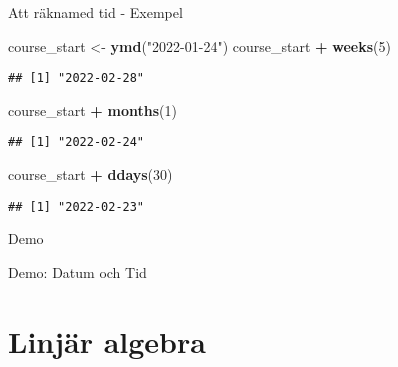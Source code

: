 \documentclass[
  11pt,
  ignorenonframetext,
  handout]{beamer}
\newenvironment{Shaded}{\begin{snugshade}}{\end{snugshade}}
\newcommand{\DecValTok}[1]{\textcolor[rgb]{0.00,0.00,0.81}{#1}}
\newcommand{\FunctionTok}[1]{\textcolor[rgb]{0.13,0.29,0.53}{\textbf{#1}}}
\newcommand{\NormalTok}[1]{#1}
\newcommand{\OtherTok}[1]{\textcolor[rgb]{0.56,0.35,0.01}{#1}}
\newcommand{\SpecialCharTok}[1]{\textcolor[rgb]{0.81,0.36,0.00}{\textbf{#1}}}
\newcommand{\StringTok}[1]{\textcolor[rgb]{0.31,0.60,0.02}{#1}}
\begin{document}
\begin{frame}[fragile]{Att räknamed tid - Exempel}
\label{att-ruxe4knamed-tid---exempel}
\begin{Shaded}
\begin{Highlighting}[]
\NormalTok{course\_start }\OtherTok{\textless{}{-}} \FunctionTok{ymd}\NormalTok{(}\StringTok{"2022{-}01{-}24"}\NormalTok{)}
\NormalTok{course\_start }\SpecialCharTok{+} \FunctionTok{weeks}\NormalTok{(}\DecValTok{5}\NormalTok{)}
\end{Highlighting}
\end{Shaded}

\begin{verbatim}
## [1] "2022-02-28"
\end{verbatim}

\begin{Shaded}
\begin{Highlighting}[]
\NormalTok{course\_start }\SpecialCharTok{+} \FunctionTok{months}\NormalTok{(}\DecValTok{1}\NormalTok{)}
\end{Highlighting}
\end{Shaded}

\begin{verbatim}
## [1] "2022-02-24"
\end{verbatim}

\begin{Shaded}
\begin{Highlighting}[]
\NormalTok{course\_start }\SpecialCharTok{+} \FunctionTok{ddays}\NormalTok{(}\DecValTok{30}\NormalTok{)}
\end{Highlighting}
\end{Shaded}

\begin{verbatim}
## [1] "2022-02-23"
\end{verbatim}
\end{frame}

\begin{frame}{Demo}
\label{demo-1}
\begin{block}{Demo: Datum och Tid}
\label{demo-datum-och-tid}
\end{block}
\end{frame}

\section{Linjär algebra}\label{linjuxe4r-algebra}
\end{document}
